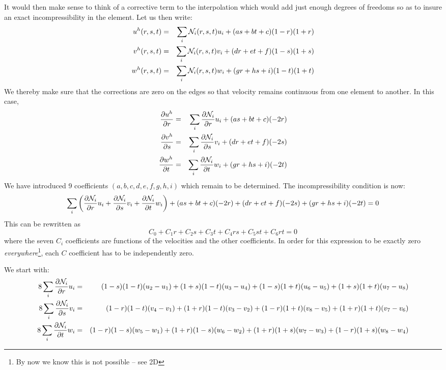 It would then make sense to think of a corrective term to the interpolation
which would add just enough degrees of freedoms so as to insure an exact
incompressibility in the element.
Let us then write:
\begin{eqnarray}
u^h(r,s,t)&=&\sum_i {\mathcal{N}}_i(r,s,t) u_i + (a s + b t +c)(1-r)(1+r) \nonumber\\
v^h(r,s,t)&=&\sum_i {\mathcal{N}}_i(r,s,t) v_i + (d r + e t +f)(1-s)(1+s) \nonumber\\
w^h(r,s,t)&=&\sum_i {\mathcal{N}}_i(r,s,t) w_i + (g r + h s +i)(1-t)(1+t) \nonumber
\end{eqnarray}
We thereby make sure that the corrections are zero on the edges 
so that velocity remains continuous from one element to another.
In this case,
\begin{eqnarray}
\frac{\partial u^h}{\partial r}&=&\sum_i \frac{\partial {\mathcal{N}}_i}{\partial r} u_i + (a s + b t +c)(-2r)\nonumber\\
\frac{\partial v^h}{\partial s}&=&\sum_i \frac{\partial {\mathcal{N}}_i}{\partial s} v_i + (d r + e t +f)(-2s)\nonumber\\
\frac{\partial w^h}{\partial t}&=&\sum_i \frac{\partial {\mathcal{N}}_i}{\partial t} w_i + (g r + h s +i)(-2t)\nonumber
\end{eqnarray}
We have introduced 9 coefficients  $(a,b,c,d,e,f,g,h,i)$ which remain to be determined.
The incompressibility condition is now:
\[
\sum_i \left(  
\frac{\partial {\mathcal{N}}_i}{\partial r} u_i+
\frac{\partial {\mathcal{N}}_i}{\partial s} v_i+
\frac{\partial {\mathcal{N}}_i}{\partial t} w_i
\right)
+ (a s + b t +c) (-2r) + (d r + e t +f)(-2s) + (g r + h s +i)(-2t) 
=0
\]
This can be rewritten as
\[
C_0  + C_1 r + C_2 s + C_3 t + C_4 rs + C_5 st + C_6 rt = 0
\]
where the seven $C_i$ coefficients are functions of the velocities and the other coefficients.
In order for this expression to be exactly zero {\it everywhere}\footnote{By now we know 
this is not possible -- see 2D}, each $C$ coefficient has
to be independently zero.

We start with:
\begin{eqnarray}
8\sum_i \frac{\partial {\mathcal{N}}_i}{\partial r} u_i 
&=& (1-s)(1-t)(u_2-u_1)
+ (1+s)(1-t)(u_3-u_4)
+ (1-s)(1+t)(u_6-u_5)
+ (1+s)(1+t)(u_7-u_8) \nonumber\\
8\sum_i \frac{\partial {\mathcal{N}}_i}{\partial s} v_i 
&=& (1-r)(1-t)(v_4-v_1)
+ (1+r)(1-t)(v_3-v_2)
+ (1-r)(1+t)(v_8-v_5)
+ (1+r)(1+t)(v_7-v_6) \nonumber\\
8\sum_i \frac{\partial {\mathcal{N}}_i}{\partial t} w_i 
&=& (1-r)(1-s)(w_5-w_1)
+ (1+r)(1-s)(w_6-w_2)
+ (1+r)(1+s)(w_7-w_3)
+ (1-r)(1+s)(w_8-w_4) \nonumber
\end{eqnarray}

